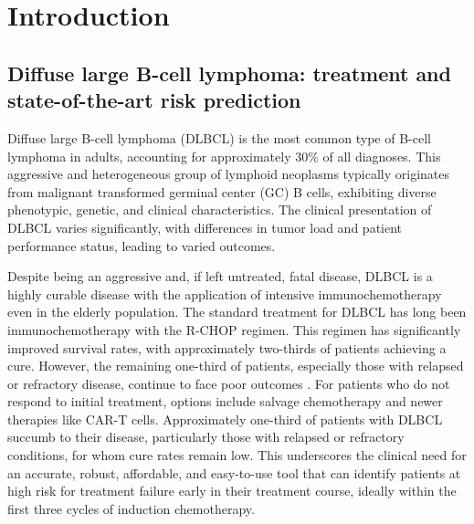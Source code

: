 \chapter{Introduction} \label{chap:intro}

\section{Diffuse large B-cell lymphoma: treatment and state-of-the-art risk prediction}

Diffuse large B-cell lymphoma (DLBCL) is the most common type of B-cell lymphoma in adults, 
accounting for approximately 30\% of all diagnoses. This aggressive and heterogeneous group of 
lymphoid neoplasms typically originates from malignant transformed germinal center (GC) B cells, 
exhibiting diverse phenotypic, genetic, and clinical characteristics. The clinical presentation of 
DLBCL varies significantly, with differences in tumor load and patient performance status, leading 
to varied outcomes.

Despite being an aggressive and, if left untreated, fatal disease, DLBCL is a highly curable disease with the 
application of intensive immunochemotherapy even in the elderly population. The standard treatment 
for DLBCL has long been immunochemotherapy with the R-CHOP regimen. This 
regimen has significantly improved survival rates, with approximately two-thirds of patients 
achieving a cure. However, the remaining one-third of patients, especially 
those with relapsed or refractory disease, continue to face poor outcomes \citep{glass17}. For patients who do not 
respond to initial treatment, options include salvage chemotherapy and newer therapies like CAR-T cells. 
Approximately one-third of patients with DLBCL succumb to their disease, particularly those with 
relapsed or refractory conditions, for whom cure rates remain low. This underscores the clinical 
need for an accurate, robust, affordable, and easy-to-use tool that can identify patients at high risk 
for treatment failure early in their treatment course, ideally within the first three cycles of 
induction chemotherapy. 

